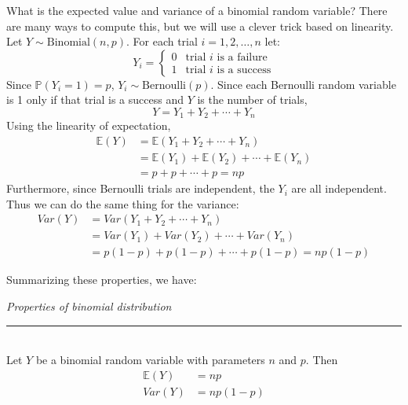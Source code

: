 \documentclass[12pt]{article}
\theoremstyle{definition}
\theoremstyle{remark}
\def\P{{\mathbb P}}
\def\E{{\mathbb E}}
\begin{document}
What is the expected value and variance of a binomial random variable? There are many ways to compute this, but we will use a clever trick based on linearity. Let $Y \sim \text{Binomial}(n, p)$. For each trial $i = 1, 2, \dots, n$ let:
\[
Y_i = \begin{cases}
0 & \text{trial $i$ is a failure}\\
1 & \text{trial $i$ is a success}
\end{cases}
\]
Since $\P(Y_i = 1) = p$, $Y_i \sim \text{Bernoulli}(p)$. Since each Bernoulli random variable is 1 only if that trial is a success and $Y$ is the number of trials,
\[
Y = Y_1 + Y_2 + \cdots + Y_n
\]
Using the linearity of expectation, 
\begin{align*}
\E(Y) &= \E(Y_1 + Y_2 + \cdots + Y_n) \\
&= \E(Y_1) + \E(Y_2) + \cdots + \E(Y_n) \\
&= p + p + \cdots + p = np
\end{align*}
Furthermore, since Bernoulli trials are independent, the $Y_i$ are all independent. Thus we can do the same thing for the variance:
\begin{align*}
Var(Y) &= Var(Y_1 + Y_2 + \cdots + Y_n) \\
&= Var(Y_1) + Var(Y_2) + \cdots + Var(Y_n) \\
&= p(1-p) + p(1-p) + \cdots + p(1-p) = np(1-p)
\end{align*}

Summarizing these properties, we have:

\begin{framed}
\emph{Properties of binomial distribution}\\
  \rule{\dimexpr{}\fboxrule}{.1pt} \\
Let $Y$ be a binomial random variable with parameters $n$ and $p$. Then
\begin{align*}
\E(Y) &= np \\
Var(Y) &= np(1-p)
\end{align*}
\end{framed}
\end{document}

